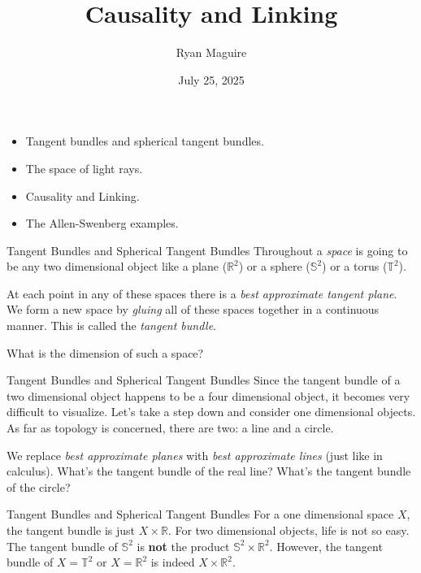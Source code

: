 \documentclass{beamer}
\title{Causality and Linking}
\author{Ryan Maguire}
\date{July 25, 2025}
\begin{document}
    \maketitle
    \begin{frame}
        \begin{itemize}
            \item
                Tangent bundles and spherical tangent bundles.
            \item
                The space of light rays.
            \item
                Causality and Linking.
            \item
                The Allen-Swenberg examples.
        \end{itemize}
    \end{frame}
    \begin{frame}{Tangent Bundles and Spherical Tangent Bundles}
        Throughout a \textit{space} is going to be any two dimensional
        object like a plane ($\mathbb{R}^{2}$) or a sphere
        ($\mathbb{S}^{2}$) or a torus ($\mathbb{T}^{2}$).
        \par\hfill\par
        At each point in any of these spaces there is a
        \textit{best approximate tangent plane}. We form a new space
        by \textit{gluing} all of these spaces together in a continuous
        manner. This is called the \textit{tangent bundle}.
        \par\hfill\par
        What is the dimension of such a space?
    \end{frame}
    \begin{frame}{Tangent Bundles and Spherical Tangent Bundles}
        Since the tangent bundle of a two dimensional object happens to be
        a four dimensional object, it becomes very difficult to visualize.
        Let's take a step down and consider one dimensional objects.
        As far as topology is concerned, there are two: a line and a circle.
        \par\hfill\par
        We replace \textit{best approximate planes} with
        \textit{best approximate lines} (just like in calculus).
        What's the tangent bundle of the real line?
        What's the tangent bundle of the circle?
    \end{frame}
    \begin{frame}{Tangent Bundles and Spherical Tangent Bundles}
        For a one dimensional space $X$, the tangent bundle is just
        $X\times\mathbb{R}$. For two dimensional objects, life is not so
        easy. The tangent bundle of $\mathbb{S}^{2}$ is \textbf{not}
        the product $\mathbb{S}^{2}\times\mathbb{R}^{2}$. However, the
        tangent bundle of $X=\mathbb{T}^{2}$ or $X=\mathbb{R}^{2}$ is indeed
        $X\times\mathbb{R}^{2}$.
    \end{frame}
\end{document}
